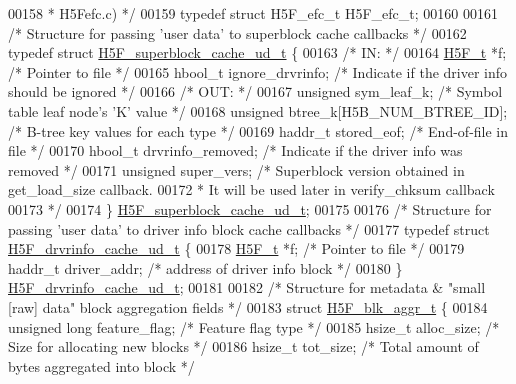 \begin{DoxyCode}
00158 \textcolor{comment}{ * H5Fefc.c) */}
00159 \textcolor{keyword}{typedef} \textcolor{keyword}{struct }H5F\_efc\_t H5F\_efc\_t;
00160 
00161 \textcolor{comment}{/* Structure for passing 'user data' to superblock cache callbacks */}
00162 \textcolor{keyword}{typedef} \textcolor{keyword}{struct }\hyperlink{struct_h5_f__superblock__cache__ud__t}{H5F\_superblock\_cache\_ud\_t} \{
00163 \textcolor{comment}{/* IN: */}
00164     \hyperlink{struct_h5_f__t}{H5F\_t} *f;               \textcolor{comment}{/* Pointer to file */}
00165     hbool\_t ignore\_drvrinfo; \textcolor{comment}{/* Indicate if the driver info should be ignored */}
00166 \textcolor{comment}{/* OUT: */}
00167     \textcolor{keywordtype}{unsigned} sym\_leaf\_k;    \textcolor{comment}{/* Symbol table leaf node's 'K' value */}
00168     \textcolor{keywordtype}{unsigned} btree\_k[H5B\_NUM\_BTREE\_ID]; \textcolor{comment}{/* B-tree key values for each type */}
00169     haddr\_t stored\_eof;     \textcolor{comment}{/* End-of-file in file */}
00170     hbool\_t drvrinfo\_removed; \textcolor{comment}{/* Indicate if the driver info was removed */}
00171     \textcolor{keywordtype}{unsigned}    super\_vers;   \textcolor{comment}{/* Superblock version obtained in get\_load\_size callback. }
00172 \textcolor{comment}{                   * It will be used later in verify\_chksum callback }
00173 \textcolor{comment}{                   */}
00174 \} \hyperlink{struct_h5_f__superblock__cache__ud__t}{H5F\_superblock\_cache\_ud\_t};
00175 
00176 \textcolor{comment}{/* Structure for passing 'user data' to driver info block cache callbacks */}
00177 \textcolor{keyword}{typedef} \textcolor{keyword}{struct }\hyperlink{struct_h5_f__drvrinfo__cache__ud__t}{H5F\_drvrinfo\_cache\_ud\_t} \{
00178     \hyperlink{struct_h5_f__t}{H5F\_t}   *f;               \textcolor{comment}{/* Pointer to file */}
00179     haddr\_t driver\_addr;      \textcolor{comment}{/* address of driver info block */}
00180 \} \hyperlink{struct_h5_f__drvrinfo__cache__ud__t}{H5F\_drvrinfo\_cache\_ud\_t};
00181 
00182 \textcolor{comment}{/* Structure for metadata & "small [raw] data" block aggregation fields */}
00183 \textcolor{keyword}{struct }\hyperlink{struct_h5_f__blk__aggr__t}{H5F\_blk\_aggr\_t} \{
00184     \textcolor{keywordtype}{unsigned} \textcolor{keywordtype}{long}       feature\_flag;   \textcolor{comment}{/* Feature flag type */}
00185     hsize\_t             alloc\_size;     \textcolor{comment}{/* Size for allocating new blocks */}
00186     hsize\_t             tot\_size;       \textcolor{comment}{/* Total amount of bytes aggregated into block */}

\end{DoxyCode}
